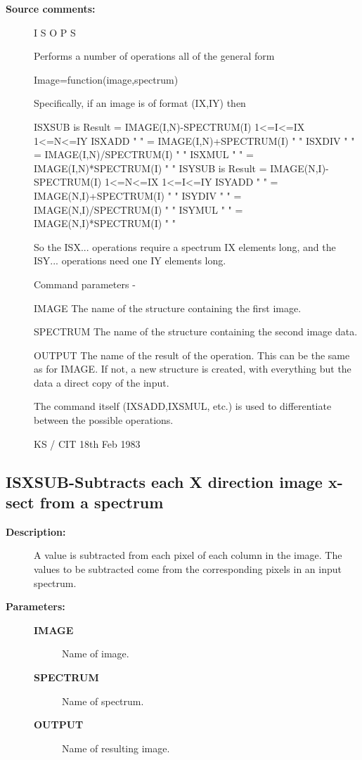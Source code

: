 \begin{description}
\begin{description}
\item [\textbf{Source comments:}]
\begin{terminalv}
 I S O P S

 Performs a number of operations all of the general form

 Image=function(image,spectrum)

 Specifically, if an image is of format (IX,IY) then

 ISXSUB is Result = IMAGE(I,N)-SPECTRUM(I) 1<=I<=IX 1<=N<=IY
 ISXADD  "   "    = IMAGE(I,N)+SPECTRUM(I)    "        "
 ISXDIV  "   "    = IMAGE(I,N)/SPECTRUM(I)    "        "
 ISXMUL  "   "    = IMAGE(I,N)*SPECTRUM(I)    "        "
 ISYSUB is Result = IMAGE(N,I)-SPECTRUM(I) 1<=N<=IX 1<=I<=IY
 ISYADD  "   "    = IMAGE(N,I)+SPECTRUM(I)    "        "
 ISYDIV  "   "    = IMAGE(N,I)/SPECTRUM(I)    "        "
 ISYMUL  "   "    = IMAGE(N,I)*SPECTRUM(I)    "        "

 So the ISX... operations require a spectrum IX elements long,
 and the ISY... operations need one IY elements long.

 Command parameters -

 IMAGE    The name of the structure containing the first image.

 SPECTRUM The name of the structure containing the second
          image data.

 OUTPUT   The name of the result of the operation.  This can
          be the same as for IMAGE.  If not, a new structure
          is created, with everything but the data a direct
          copy of the input.

 The command itself (IXSADD,IXSMUL, etc.) is used to
 differentiate between the possible operations.

                                  KS / CIT 18th Feb 1983
\end{terminalv}
\end{description}
\subsection{ISXSUB-\label{ISXSUB}Subtracts each X direction image x-sect from a spectrum}
\begin{description}

\item [\textbf{Description:}]
 A value is subtracted from each pixel of each column in the image.
 The values to be subtracted come from the corresponding pixels in
 an input spectrum.

\item [\textbf{Parameters:}]
\begin{description}
\item [\textbf{IMAGE}]
 Name of image.
\item [\textbf{SPECTRUM}]
 Name of spectrum.
\item [\textbf{OUTPUT}]
 Name of resulting image.
\end{description}


\end{description}
\end{description}

